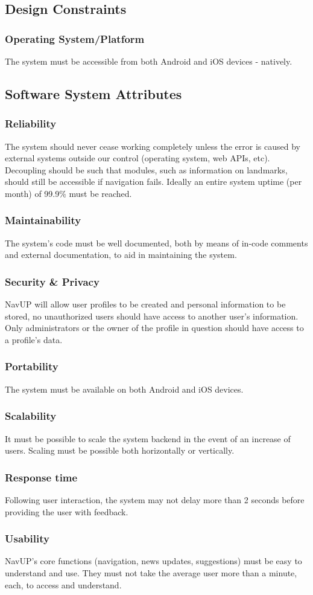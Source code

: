 \documentclass[12pt, a4paper]{article}
\begin{document}
	\subsection{Design Constraints}
		\subsubsection{Operating System/Platform} The system must be accessible from both Android and iOS devices - natively.		
	\subsection{Software System Attributes}
		\subsubsection{Reliability} The system should never cease working completely unless the error is caused by external systems outside our control (operating system, web APIs, etc). Decoupling should be such that modules, such as information on landmarks, should still be accessible if navigation fails. Ideally an entire system uptime (per month) of 99.9\% must be reached.
		\subsubsection{Maintainability} The system's code must be well documented, both by means of in-code comments and external documentation, to aid in maintaining the system.
		\subsubsection{Security \& Privacy} NavUP will allow user profiles to be created and personal information to be stored, no unauthorized users should have access to another user's information. Only administrators or the owner of the profile in question should have access to a profile's data.
		\subsubsection{Portability} The system must be available on both Android and iOS devices.
		\subsubsection{Scalability} It must be possible to scale the system backend in the event of an increase of users. Scaling must be possible both horizontally or vertically.
		\subsubsection{Response time} Following user interaction, the system may not delay more than 2 seconds before providing the user with feedback.
		\subsubsection{Usability} NavUP's core functions (navigation, news updates, suggestions) must be easy to understand and use. They must not take the average user more than a minute, each, to access and understand. 
\end{document}
